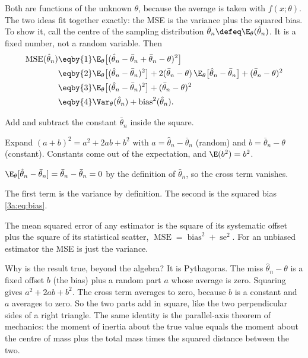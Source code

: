 Both are functions of the unknown $\theta$, because the average is taken
with $f(x;\theta)$. The two ideas fit together exactly: the MSE is the
variance plus the squared bias. To show it, call the centre of the sampling
distribution $\bar\theta_n\defeq\E_\theta(\hat\theta_n)$. It is a fixed
number, not a random variable. Then
\begin{align}
  \operatorname{MSE}(\hat\theta_n)
  &\eqby{1} \E_\theta\bigl[(\hat\theta_n-\bar\theta_n+\bar\theta_n-\theta)^2\bigr]
     \nonumber\\
  &\eqby{2} \E_\theta\bigl[(\hat\theta_n-\bar\theta_n)^2\bigr]
     +2(\bar\theta_n-\theta)\,\E_\theta\bigl[\hat\theta_n-\bar\theta_n\bigr]
     +(\bar\theta_n-\theta)^2 \nonumber\\
  &\eqby{3} \E_\theta\bigl[(\hat\theta_n-\bar\theta_n)^2\bigr]+(\bar\theta_n-\theta)^2
     \nonumber\\
  &\eqby{4} \Var_\theta(\hat\theta_n)+\operatorname{bias}^2(\hat\theta_n).
  \label{3a:eq:mse-decomp}
\end{align}
\begin{explain}
  \item Add and subtract the constant $\bar\theta_n$ inside the square.
  \item Expand $(a+b)^2=a^2+2ab+b^2$ with $a=\hat\theta_n-\bar\theta_n$ (random)
        and $b=\bar\theta_n-\theta$ (constant). Constants come out of the
        expectation, and $\E(b^2)=b^2$.
  \item $\E_\theta[\hat\theta_n-\bar\theta_n]=\bar\theta_n-\bar\theta_n=0$ by the
        definition of $\bar\theta_n$, so the cross term vanishes.
  \item The first term is the variance by definition. The second is the
        squared bias \eqref{3a:eq:bias}.
\end{explain}

\begin{keyidea}[MSE = bias$^2$ + variance]
The mean squared error of any estimator is the square of its systematic
offset plus the square of its statistical scatter,
$\operatorname{MSE}=\operatorname{bias}^2+\operatorname{se}^2$. For an
unbiased estimator the MSE is just the variance.
\end{keyidea}

Why is the result true, beyond the algebra? It is Pythagoras. The miss
$\hat\theta_n-\theta$ is a fixed offset $b$ (the bias) plus a random part
$a$ whose average is zero. Squaring gives $a^2+2ab+b^2$. The cross term
averages to zero, because $b$ is a constant and $a$ averages to zero. So the
two parts add in square, like the two perpendicular sides of a right
triangle. The same identity is the parallel-axis theorem of mechanics: the
moment of inertia about the true value equals the moment about the centre of
mass plus the total mass times the squared distance between the two.

